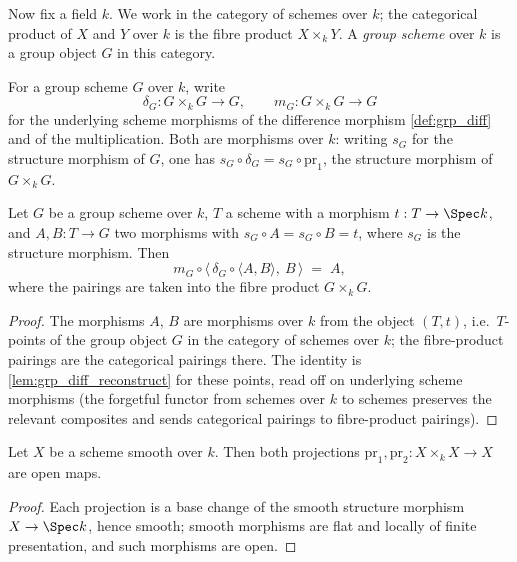 Now fix a field \(k\). We work in the category of schemes over \(k\); the
categorical product of \(X\) and \(Y\) over \(k\) is the fibre product
\(X \times_k Y\). A \emph{group scheme} over \(k\) is a group object \(G\) in
this category.

\begin{definition}
  \label{def:grp_scheme_diff}
  \leanok
  For a group scheme \(G\) over \(k\), write
  \[
    \delta_G : G \times_k G \longrightarrow G,
    \qquad
    m_G : G \times_k G \longrightarrow G
  \]
  for the underlying scheme morphisms of the difference morphism
  \ref{def:grp_diff} and of the multiplication. Both are morphisms over \(k\):
  writing \(s_G\) for the structure morphism of \(G\), one has
  \(s_G \circ \delta_G = s_G \circ \mathrm{pr}_1\), the structure morphism of
  \(G \times_k G\).
\end{definition}

\begin{lemma}
  \label{lem:grp_scheme_diff_reconstruct}
  \leanok
  Let \(G\) be a group scheme over \(k\), \(T\) a scheme with a morphism
  \(t : T \to \Spec k\), and \(A, B : T \to G\) two morphisms with
  \(s_G \circ A = s_G \circ B = t\), where \(s_G\) is the structure morphism.
  Then
  \[
    m_G \circ \bigl\langle\, \delta_G \circ \langle A, B\rangle,\ B \,\bigr\rangle
    \;=\; A ,
  \]
  where the pairings are taken into the fibre product \(G \times_k G\).
\end{lemma}
\begin{proof}
  \leanok
  The morphisms \(A\), \(B\) are morphisms over \(k\) from the object
  \((T, t)\), i.e.\ \(T\)-points of the group object \(G\) in the category of
  schemes over \(k\); the fibre-product pairings are the categorical pairings
  there. The identity is \ref{lem:grp_diff_reconstruct} for these points, read
  off on underlying scheme morphisms (the forgetful functor from schemes over
  \(k\) to schemes preserves the relevant composites and sends categorical
  pairings to fibre-product pairings).
\end{proof}

\begin{lemma}
  \label{lem:self_product_open}
  \leanok
  Let \(X\) be a scheme smooth over \(k\). Then both projections
  \(\mathrm{pr}_1, \mathrm{pr}_2 : X \times_k X \to X\) are open maps.
\end{lemma}
\begin{proof}
  \leanok
  Each projection is a base change of the smooth structure morphism
  \(X \to \Spec k\), hence smooth; smooth morphisms are flat and locally of
  finite presentation, and such morphisms are open.
\end{proof}

